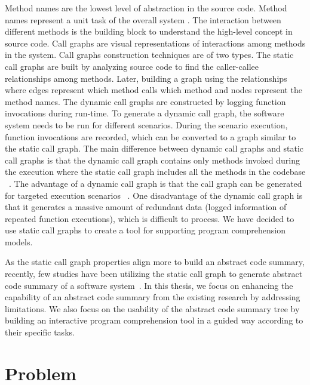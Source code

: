 Method names are the lowest level of abstraction in the source code. Method names represent a unit task of the overall system \cite{de2012IRMethodsArtifacts, starke2009searching}. The interaction between different methods is the building block to understand the high-level concept in source code. Call graphs are visual representations of interactions among methods in the system. Call graphs construction techniques are of two types. The static call graphs are built by analyzing source code to find the caller-callee relationships among methods. Later, building a graph using the relationships where edges represent which method calls which method and nodes represent the method names. The dynamic call graphs are constructed by logging function invocations during run-time. To generate a dynamic call graph, the software system needs to be run for different scenarios. During the scenario execution, function invocations are recorded, which can be converted to a graph similar to the static call graph. The main difference between dynamic call graphs and static call graphs is that the dynamic call graph contains only methods invoked during the execution where the static call graph includes all the methods in the codebase ~\cite{gharibi2018automaticStaticCluster}. The advantage of a dynamic call graph is that the call graph can be generated for targeted execution scenarios ~\cite{feng2018hierarchicalExecutionComprehension}. One disadvantage of the dynamic call graph is that it generates a massive amount of redundant data (logged information of repeated function executions), which is difficult to process. We have decided to use static call graphs to create a tool for supporting program comprehension models. 

As the static call graph properties align more to build an abstract code summary, recently, few studies have been utilizing the static call graph to generate abstract code summary of a software system~\cite{gharibi2018automaticStaticCluster, walunj2019graphevoEvolutionCall}. In this thesis, we focus on enhancing the capability of an abstract code summary from the existing research by addressing limitations. We also focus on the usability of the abstract code summary tree by building an interactive program comprehension tool
in a guided way according to their specific tasks. 
 
\newpage


\section{Problem }
\label{intro:problem}
